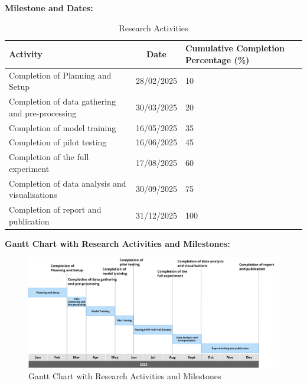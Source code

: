 \documentclass[12pt,a4paper]{article}
\begin{document}
\textbf{Milestone and Dates:} 
\begin{table}[h]
    \centering
    \begin{tabular}{| p{8cm} | c | p{5cm} |}
    \hline
    \textbf{Activity} & \textbf{Date} & \textbf{Cumulative Completion Percentage (\%)} \\
    \hline
    Completion of Planning and Setup & 28/02/2025 & 10 \\
    \hline
    Completion of data gathering and pre-processing & 30/03/2025 & 20 \\
    \hline
    Completion of model training & 16/05/2025 & 35 \\
    \hline
    Completion of pilot testing & 16/06/2025 & 45 \\
    \hline
    Completion of the full experiment & 17/08/2025 & 60 \\
    \hline
    Completion of data analysis and visualisations & 30/09/2025 & 75 \\
    \hline
    Completion of report and publication & 31/12/2025 & 100 \\
    \hline
    \end{tabular}
    \caption{Research Activities}
    \label{Research Activities}
\end{table}

\newpage

\textbf{Gantt Chart with Research Activities and Milestones:}
\begin{figure}[h]
    \centering
    \includegraphics[width=1\linewidth]{Gantt Chart.png}
    \caption{Gantt Chart with Research Activities and Milestones}
    \label{fig:enter-label}
\end{figure}


\end{document}
